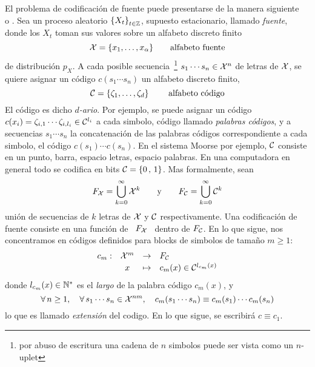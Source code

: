 El  problema  de  codificaci\'on  de  fuente  puede  presentarse  de  la  manera
siguiente~\cite[cap.~5]{CovTho06}   o  \cite[cap.~13]{Rio07}.  Sea   un  proceso
aleatorio $\left\{  X_t \right\}_{t \in \mathbb{Z}}$,  supuesto estacionario, llamado
{\it  fuente}, donde  los $X_t$  toman sus  valores sobre  un  alfabeto discreto
finito
%
\[
\mathcal{X} = \{ x_1 , \ldots , x_\alpha \} \qquad \mbox{alfabeto fuente}
\]
%
de  distribuci\'on  $p_X$.   A  cada posible  secuencia~\footnote{por  abuso  de
  escritura una cadena  de $n$ simbolos puede ser vista  como un $n$-uplet} $s_1
\cdots s_n  \in \mathcal{X}^n$ de  letras de $\mathcal{X}$,  se quiere asignar un  c\'odigo $c(s_1
\cdots s_n)$ un alfabeto discreto finito,
%
\[
\mathcal{C} = \{ \zeta_1 , \ldots , \zeta_d \} \qquad \mbox{ alfabeto c\'odigo}
\]
%
El c\'odigo es dicho {\it $d$-ario}.   Por ejemplo, se puede asignar un c\'odigo
$c(x_i)  =  \zeta_{i,1}  \cdots  \zeta_{i,l_i}  \in \mathcal{C}^{l_i}$  a  cada  simbolo,
c\'odigo llamado  {\it palabras c\'odigos}, y  a secuencias $s_1  \cdots s_n$ la
concatenaci\'on de las palabras c\'odigos correspondiente a cada simbolo, \ie el
c\'odigo $c(s_1) \cdots c(s_n)$. En el sistema Moorse por ejemplo, $\mathcal{C}$ consiste
en un  punto, barra,  espacio letras, espacio  palabras.  En una  computadora en
general todo se codifica en bits $\mathcal{C} = \{ 0 \, , \, 1\}$.  Mas formalmente, sean
%
\[
F_{\mathcal{X}}   =   \bigcup_{k=0}^{\infty}   \mathcal{X}^k   \qquad   \mbox{y}   \qquad   F_{\mathcal{C}}   =
\bigcup_{k=0}^{\infty} \mathcal{C}^k
\]
%
uni\'on  de  secuencias de  $k$  letras de  $\mathcal{X}$  y  $\mathcal{C}$ respectivamente.   Una
codificaci\'on  de fuente  consiste en  una funci\'on  de \  $F_{\mathcal{X}}$ \  dentro de
$F_{\mathcal{C}}$. En lo que sigue, nos  concentramos en c\'odigos definidos para blocks de
simbolos de tama\~no $m \ge 1$:
%
\[
\begin{array}{lccl}
c_m: & \X^m & \rightarrow & F_\C\\[.5mm]
%
& x & \mapsto & c_m(x) \in \C^{l_{c_m}(x)}
\end{array}
\]
%
donde $l_{c_m}(x) \in \mathbb{N}^*$ es el  {\it largo} de la palabra c\'odigo $c_m(x)$,
y
%
\[
\forall \, n \ge 1, \quad \forall  \, s_1 \cdots s_n \in \mathcal{X}^{n m}, \quad c_m(s_1
\cdots s_n) \equiv c_m(s_1) \cdots c_m(s_n)
\]
%
lo que es llamado {\it extensi\'on} del codigo.  En lo que sigue, se escribir\'a
$c \equiv c_1$.

